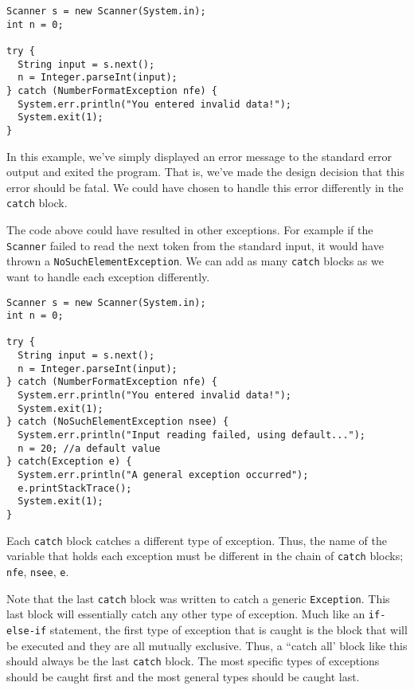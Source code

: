 \begin{verbatim}
Scanner s = new Scanner(System.in);
int n = 0;
		
try {
  String input = s.next();
  n = Integer.parseInt(input);
} catch (NumberFormatException nfe) {
  System.err.println("You entered invalid data!");
  System.exit(1);
}
\end{verbatim}

In this example, we've simply displayed an error message to
the standard error output and exited the program.  That is, 
we've made the design decision that this error should be fatal.
We could have chosen to handle this error differently in the
\texttt{catch} block.

The code above could have resulted in other exceptions.  For
example if the \texttt{Scanner} failed to read the
next token from the standard input, it would have thrown a
\texttt{NoSuchElementException}.  We can add
as many \texttt{catch} blocks as we want to handle
each exception differently.

\begin{verbatim}
Scanner s = new Scanner(System.in);
int n = 0;
		
try {
  String input = s.next();
  n = Integer.parseInt(input);
} catch (NumberFormatException nfe) {
  System.err.println("You entered invalid data!");
  System.exit(1);
} catch (NoSuchElementException nsee) {
  System.err.println("Input reading failed, using default...");
  n = 20; //a default value
} catch(Exception e) {
  System.err.println("A general exception occurred");
  e.printStackTrace();
  System.exit(1);
}
\end{verbatim}

Each \texttt{catch} block catches a different 
type of exception.  Thus, the name of the variable
that holds each exception must be different in the chain
of \texttt{catch} blocks; \texttt{nfe}, 
\texttt{nsee}, \texttt{e}.

Note that the last \texttt{catch} block was written
to catch a generic \texttt{Exception}.  This last
block will essentially catch any other type of exception.  
Much like an \texttt{if-else-if} statement, the
first type of exception that is caught is the block that will
be executed and they are all mutually exclusive.  Thus, a
``catch all' block like this should always be the last 
\texttt{catch} block.  The most specific types
of exceptions should be caught first and the most general
types should be caught last.

